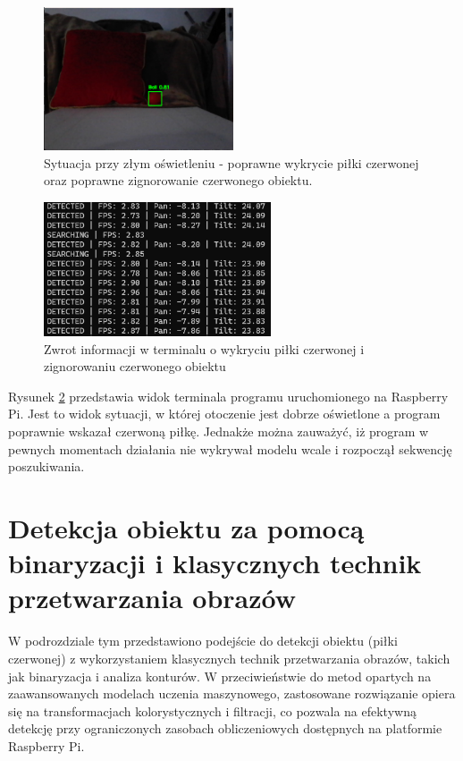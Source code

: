 \documentclass[a4paper,twoside,12pt]{book}
\begin{document}
\begin{figure}[!hb]
    \centering
    \includegraphics[width=0.5\textwidth]{Images/Porownanie/Yolo7 robot/Zrzut ekranu 2025-01-02 194641.png}
    \caption{Sytuacja przy złym oświetleniu - poprawne wykrycie piłki czerwonej oraz poprawne zignorowanie czerwonego obiektu.}
    \label{fig:Wykrycie piłki4}
\end{figure}


\begin{figure}[h]
    \centering
    \includegraphics[width=0.6\textwidth]{Images/Porownanie/Yolo7 robot/pilka i poduszka zgaszone swiatlo dalej wykrywa.png}
    \caption{Zwrot informacji w terminalu o wykryciu piłki czerwonej i zignorowaniu czerwonego obiektu}
    \label{fig:Wykrycie piłki5}
\end{figure}

Rysunek \ref{fig:Wykrycie piłki5} przedstawia widok terminala programu uruchomionego na Raspberry Pi. Jest to widok sytuacji, w której otoczenie jest dobrze oświetlone a program poprawnie wskazał czerwoną piłkę. Jednakże można zauważyć, iż program w pewnych momentach działania nie wykrywał modelu wcale i rozpoczął sekwencję poszukiwania.

\newpage

\section{Detekcja obiektu za pomocą binaryzacji i klasycznych technik przetwarzania obrazów}

W podrozdziale tym przedstawiono podejście do detekcji obiektu (piłki czerwonej) z wykorzystaniem klasycznych technik przetwarzania obrazów, takich jak binaryzacja i analiza konturów. W przeciwieństwie do metod opartych na zaawansowanych modelach uczenia maszynowego, zastosowane rozwiązanie opiera się na transformacjach kolorystycznych i filtracji, co pozwala na efektywną detekcję przy ograniczonych zasobach obliczeniowych dostępnych na platformie Raspberry Pi.
\end{document}

